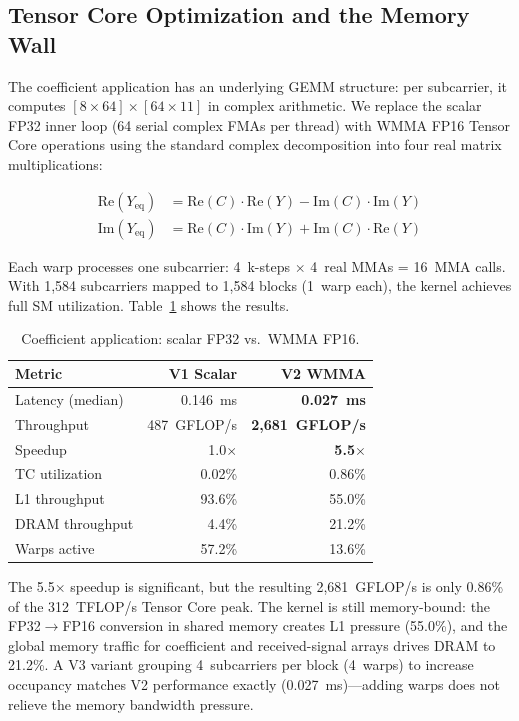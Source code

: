 \subsection{Tensor Core Optimization and the Memory Wall}

The coefficient application has an underlying GEMM structure: per subcarrier, it computes $[8 \times 64] \times [64 \times 11]$ in complex arithmetic. We replace the scalar FP32 inner loop (64 serial complex FMAs per thread) with WMMA FP16 Tensor Core operations using the standard complex decomposition into four real matrix multiplications:

\begin{align}
\text{Re}(Y_{\text{eq}}) &= \text{Re}(C) \cdot \text{Re}(Y) - \text{Im}(C) \cdot \text{Im}(Y) \nonumber \\
\text{Im}(Y_{\text{eq}}) &= \text{Re}(C) \cdot \text{Im}(Y) + \text{Im}(C) \cdot \text{Re}(Y) \nonumber
\end{align}

Each warp processes one subcarrier: 4~k-steps $\times$ 4~real MMAs = 16~MMA calls. With 1,584 subcarriers mapped to 1,584 blocks (1~warp each), the kernel achieves full SM utilization. Table~\ref{tab:optimization} shows the results.

\begin{table}[h]
\centering
\small
\caption{Coefficient application: scalar FP32 vs.\ WMMA FP16.}
\label{tab:optimization}
\begin{tabular}{lrr}
\toprule
Metric & V1 Scalar & V2 WMMA \\
\midrule
Latency (median) & 0.146~ms & \textbf{0.027~ms} \\
Throughput & 487~GFLOP/s & \textbf{2,681~GFLOP/s} \\
Speedup & 1.0$\times$ & \textbf{5.5$\times$} \\
TC utilization & 0.02\% & 0.86\% \\
L1 throughput & 93.6\% & 55.0\% \\
DRAM throughput & 4.4\% & 21.2\% \\
Warps active & 57.2\% & 13.6\% \\
\bottomrule
\end{tabular}
\end{table}

The 5.5$\times$ speedup is significant, but the resulting 2,681~GFLOP/s is only 0.86\% of the 312~TFLOP/s Tensor Core peak. The kernel is still memory-bound: the FP32$\rightarrow$FP16 conversion in shared memory creates L1 pressure (55.0\%), and the global memory traffic for coefficient and received-signal arrays drives DRAM to 21.2\%. A V3 variant grouping 4~subcarriers per block (4~warps) to increase occupancy matches V2 performance exactly (0.027~ms)---adding warps does not relieve the memory bandwidth pressure.

